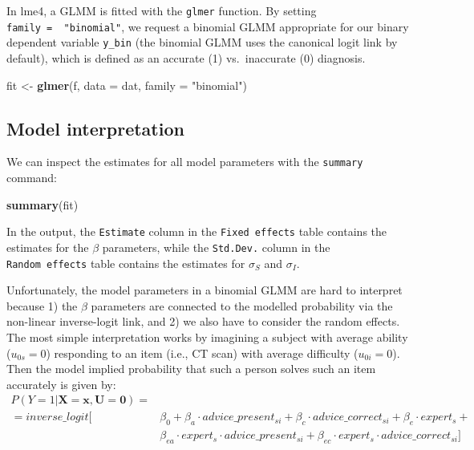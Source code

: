 \documentclass[
  man,floatsintext]{apa6}
\newenvironment{Shaded}{\begin{snugshade}}{\end{snugshade}}
\newcommand{\AttributeTok}[1]{\textcolor[rgb]{0.13,0.29,0.53}{#1}}
\newcommand{\FunctionTok}[1]{\textcolor[rgb]{0.13,0.29,0.53}{\textbf{#1}}}
\newcommand{\NormalTok}[1]{#1}
\newcommand{\OtherTok}[1]{\textcolor[rgb]{0.56,0.35,0.01}{#1}}
\newcommand{\StringTok}[1]{\textcolor[rgb]{0.31,0.60,0.02}{#1}}
\begin{document}
In lme4, a GLMM is fitted with the \texttt{glmer} function. By setting \texttt{family\ =\ \ "binomial"}, we request a binomial GLMM appropriate for our binary dependent variable \texttt{y\_bin} (the binomial GLMM uses the canonical logit link by default), which is defined as an accurate (1) vs.~inaccurate (0) diagnosis.

\begin{Shaded}
\begin{Highlighting}[]
\NormalTok{fit }\OtherTok{\textless{}{-}} \FunctionTok{glmer}\NormalTok{(f, }\AttributeTok{data =}\NormalTok{ dat, }\AttributeTok{family =} \StringTok{"binomial"}\NormalTok{)}
\end{Highlighting}
\end{Shaded}

\hypertarget{model-interpretation}{%
\subsection{Model interpretation}\label{model-interpretation}}

We can inspect the estimates for all model parameters with the \texttt{summary} command:

\begin{Shaded}
\begin{Highlighting}[]
\FunctionTok{summary}\NormalTok{(fit)}
\end{Highlighting}
\end{Shaded}

In the output, the \texttt{Estimate} column in the \texttt{Fixed\ effects} table contains the estimates for the \(\beta\) parameters, while the \texttt{Std.Dev.} column in the \texttt{Random\ effects} table contains the estimates for \(\sigma_S\) and \(\sigma_I\).

Unfortunately, the model parameters in a binomial GLMM are hard to interpret because 1) the \(\beta\) parameters are connected to the modelled probability via the non-linear inverse-logit link, and 2) we also have to consider the random effects. The most simple interpretation works by imagining a subject with average ability (\(u_{0s} = 0\)) responding to an item (i.e., CT scan) with average difficulty (\(u_{0i} = 0\)). Then the model implied probability that such a person solves such an item accurately is given by: \[
\begin{aligned}
P(Y=1|\mathbf{X=x}, \mathbf{U} = \mathbf{0}) = \\
= inverse\_logit[&\beta_0 + \beta_a \cdot advice\_present_{si} + \beta_c \cdot advice\_correct_{si} + \beta_e \cdot expert_s + \\
&\beta_{ea} \cdot expert_{s} \cdot advice\_present_{si} + \beta_{ec} \cdot expert_{s} \cdot advice\_correct_{si}]
\end{aligned}
\]
\end{document}
